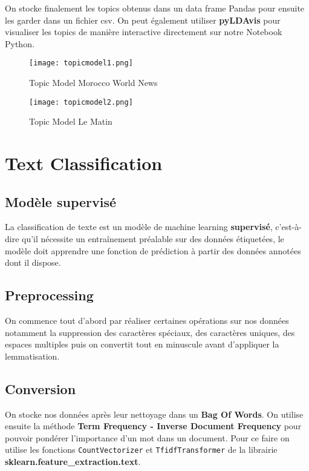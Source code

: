 \documentclass[a4paper,french,12pt]{article}
\begin{document}
On stocke finalement les topics obtenus dans un data frame Pandas pour ensuite les garder dans un fichier csv. On peut également utiliser \textbf{pyLDAvis} pour visualiser les topics de manière interactive directement sur notre Notebook Python.\\

\begin{figure}[!h]
    \centering
    \texttt{[image: topicmodel1.png]}
    \caption{Topic Model Morocco World News}
\end{figure}

\hspace{100cm}

\begin{figure}[!h]
    \centering
    \texttt{[image: topicmodel2.png]}
    \caption{Topic Model Le Matin}
\end{figure}

\newpage

\section{Text Classification}
\label{sec:Text Classification}

\subsection{Modèle supervisé}

La classification de texte est un modèle de machine learning \textbf{supervisé}, c'est-à-dire qu'il nécessite un entraînement préalable sur des données étiquetées, le modèle doit apprendre une fonction de prédiction à partir des données annotées dont il dispose.

\subsection{Preprocessing}

On commence tout d’abord par réaliser certaines opérations sur nos données notamment la suppression des caractères spéciaux, des caractères uniques, des espaces multiples puis on convertit tout en minuscule avant d'appliquer la lemmatisation.

\subsection{Conversion}

On stocke nos données après leur nettoyage dans un \textbf{Bag Of Words}. On utilise ensuite la méthode \textbf{Term Frequency - Inverse Document Frequency} pour pouvoir pondérer l'importance d'un mot dans un document. Pour ce faire on utilise les fonctions \verb|CountVectorizer| et \verb|TfidfTransformer| de la librairie \textbf{sklearn.feature\_extraction.text}.
\end{document}
